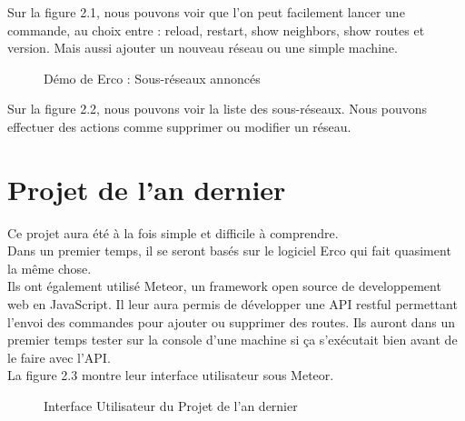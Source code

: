 Sur la figure 2.1, nous pouvons voir que l'on peut facilement lancer une commande, au choix entre : reload, restart, show neighbors, show routes et version. Mais aussi ajouter un nouveau réseau ou une simple machine.

\begin{figure}[H]
\caption{Démo de Erco : Sous-réseaux annoncés}
\end{figure}

Sur la figure 2.2, nous pouvons voir la liste des sous-réseaux. Nous pouvons effectuer des actions comme supprimer ou modifier un réseau.

\section{Projet de l'an dernier}
Ce projet aura été à la fois simple et difficile à comprendre. \\ \indent
Dans un premier temps, il se seront basés sur le logiciel Erco qui fait quasiment la même chose. \\ \indent
Ils ont également utilisé Meteor, un framework open source de developpement web en JavaScript.
Il leur aura permis de développer une API restful permettant l'envoi des commandes pour ajouter ou supprimer des routes. Ils auront dans un premier temps tester sur la console d'une machine si ça s'exécutait bien avant de le faire avec l'API. \\ \indent
La figure 2.3 montre leur interface utilisateur sous Meteor.

\begin{figure}[H]
\caption{Interface Utilisateur du Projet de l'an dernier}
\end{figure}

